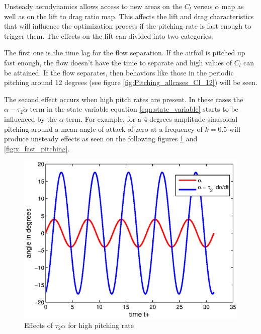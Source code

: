 Unsteady aerodynamics allows access to new areas on the $C_l$ versus $\alpha$ map as well as on the lift to drag ratio map.
This affects the lift and drag characteristics that will influence the optimization process if the pitching rate is fast enough to trigger them.
The effects on the lift can divided into two categories.

\par The first one is the time lag for the flow separation. 
If the airfoil is pitched up fast enough, the flow doesn't have the time to separate and high values of $C_l$ can be attained.
If the flow separates, then behaviors like those in the periodic pitching around 12 degrees (see figure \ref{fig:Pitching_allcases_Cl_12}) will be seen.

\par The second effect occurs when high pitch rates are present.
In these cases the $\alpha - \tau_2 \dot{\alpha}$ term in the state variable equation \ref{eqn:state_variable} starts to be influenced by the $\dot{\alpha}$ term. 
For example, for a 4 degrees amplitude sinusoidal pitching around a mean angle of attack of zero at a frequency of $k=0.5$ will produce unsteady effects as seen on the following figures \ref{fig:alpha_dalpha_vs_t} and \ref{fig:x_fast_pitching}.

\begin{figure}[h]
  \centering
  \includegraphics{./Figures/alpha_dalpha_sin_amp=4_k=0p5.eps}
  \caption{Effects of $\tau_2 \dot{\alpha}$ for high pitching rate}
  \label{fig:alpha_dalpha_vs_t}
\end{figure}


